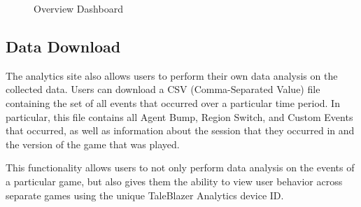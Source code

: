 \begin{figure}[H]
	\caption[Analytics Site: Overview Dashboard]{\label{fig:overview_dashboard} Overview Dashboard}
\end{figure}


\subsection{Data Download}

The analytics site also allows users to perform their own data analysis on the collected data. Users can download a CSV (Comma-Separated Value) file containing the set of all events that occurred over a particular time period. In particular, this file contains all Agent Bump, Region Switch, and Custom Events that occurred, as well as information about the session that they occurred in and the version of the game that was played. 

This functionality allows users to not only perform data analysis on the events of a particular game, but also gives them the ability to view user behavior across separate games using the unique TaleBlazer Analytics device ID. 
















	




















